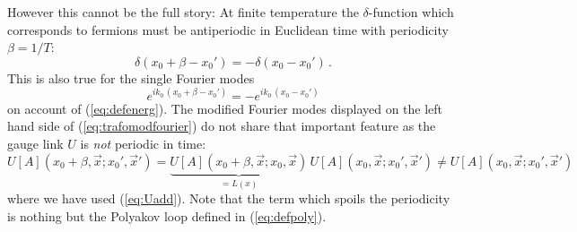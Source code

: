 \documentclass[a4paper,showpacs,showkeys,prd,nofootinbib]{revtex4}
\begin{document}
However this cannot be the full story: At finite temperature the $\delta$-function
which corresponds to fermions must be antiperiodic in Euclidean time with periodicity 
$\beta = 1/T$:
\begin{equation}
  \label{eq:antiperdelta}
\delta(x_0 + \beta - x_0') = - \delta(x_0 - x_0')  \,.
\end{equation}
This is also true for the single Fourier modes 
\begin{equation}
  \label{eq:antiperefnc}
e^{i k_0 \, (x_0 + \beta - x_0')} = - e^{i k_0 \, (x_0 - x_0')}
\end{equation}
on account of (\ref{eq:defenerg}).
The modified Fourier modes displayed on the left hand side of (\ref{eq:trafomodfourier})
do not share that important feature as the gauge link $U$ is {\em not} 
periodic in time:
\begin{equation}
  \label{eq:Unonper}
U[A](x_0+\beta,\vec x;x_0',\vec x') 
= \underbrace{U[A](x_0+\beta,\vec x;x_0,\vec x)}_{=L(x)} 
\, U[A](x_0,\vec x;x_0',\vec x') \neq U[A](x_0,\vec x;x_0',\vec x') 
\end{equation}
where we have used (\ref{eq:Uadd}). Note that the term which spoils the periodicity
is nothing but the Polyakov loop defined in (\ref{eq:defpoly}).
\end{document}
